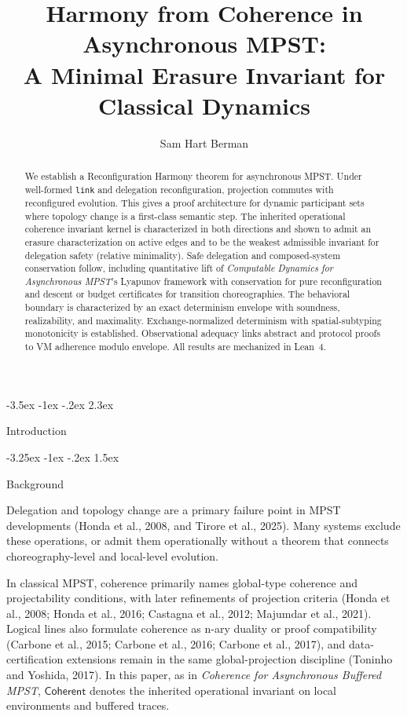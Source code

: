 \documentclass[a4paper,10pt,twocolumn,english]{article}
\title{Harmony from Coherence in Asynchronous MPST:\\A Minimal Erasure Invariant for Classical Dynamics}
\author{Sam Hart Berman}
\date{\empty}
\makeatletter
\renewcommand{\section}{\@startsection{section}{1}{\z@}%
  {-3.5ex \@plus -1ex \@minus -.2ex}%
  {2.3ex}%
  {\raggedright\normalfont\large\bfseries}}
\renewcommand{\subsection}{\@startsection{subsection}{2}{\z@}%
  {-3.25ex \@plus -1ex \@minus -.2ex}%
  {1.5ex}%
  {\raggedright\normalfont\normalsize\bfseries}}
\numberwithin{equation}{section}
\theoremstyle{paperdef}
\theoremstyle{paperplain}
\theoremstyle{paperdef}
\theoremstyle{paperremark}
\theoremstyle{paperdef}
\newcommand{\Coherent}{\ensuremath{\mathsf{Coherent}}}
\makeatother
\begin{document}
\maketitle

\begin{abstract}
	We establish a Reconfiguration Harmony theorem for asynchronous MPST. Under well-formed
	\texttt{link} and delegation reconfiguration, projection commutes with reconfigured evolution.
	This gives a proof architecture for dynamic participant sets where topology change is a first-class
	semantic step. The inherited operational coherence invariant kernel is characterized
	in both directions and shown to admit an erasure characterization on active edges and to be the
	weakest admissible invariant for delegation safety (relative minimality). Safe delegation and
	composed-system conservation follow, including quantitative lift of
	\emph{Computable Dynamics for Asynchronous MPST}'s Lyapunov framework with conservation for pure reconfiguration and descent or budget
	certificates for transition choreographies. The behavioral boundary is characterized by an exact
	determinism envelope with soundness, realizability, and maximality. Exchange-normalized determinism
	with spatial-subtyping monotonicity is established. Observational adequacy links abstract and
	protocol proofs to VM adherence modulo envelope. All results are mechanized in Lean~4.
\end{abstract}

\section{Introduction}
\label{sec:introduction}

\subsection{Background}

Delegation and topology change are a primary failure point in MPST developments (Honda et al., 2008,
and Tirore et al., 2025). Many systems exclude these operations, or admit them operationally without
a theorem that connects choreography-level and local-level evolution.

In classical MPST, coherence primarily names global-type coherence and projectability
conditions, with later refinements of projection criteria (Honda et al., 2008; Honda et al., 2016;
Castagna et al., 2012; Majumdar et al., 2021). Logical lines also formulate
coherence as n-ary duality or proof compatibility (Carbone et al., 2015; Carbone et al., 2016; Carbone
et al., 2017), and data-certification extensions remain in the same global-projection discipline
(Toninho and Yoshida, 2017). In this paper, as in \emph{Coherence for Asynchronous Buffered MPST}, $\Coherent$ denotes
the inherited operational invariant on local environments and buffered traces.
\end{document}
